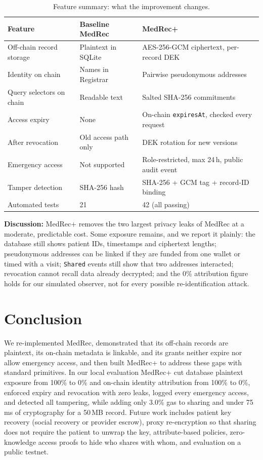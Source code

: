 \documentclass[11pt,a4paper]{article}
\begin{document}
\begin{table}[H]
\centering\small
\caption{Feature summary: what the improvement changes.}
\label{tab:features}
\begin{tabularx}{\linewidth}{@{}l Y Y@{}}
\toprule
\textbf{Feature} & \textbf{Baseline MedRec} & \textbf{MedRec+} \\
\midrule
Off-chain record storage & Plaintext in SQLite & AES-256-GCM ciphertext, per-record DEK \\
Identity on chain & Names in Registrar & Pairwise pseudonymous addresses \\
Query selectors on chain & Readable text & Salted SHA-256 commitments \\
Access expiry & None & On-chain \texttt{expiresAt}, checked every request \\
After revocation & Old access path only & DEK rotation for new versions \\
Emergency access & Not supported & Role-restricted, max 24\,h, public audit event \\
Tamper detection & SHA-256 hash & SHA-256 + GCM tag + record-ID binding \\
Automated tests & 21 & 42 (all passing) \\
\bottomrule
\end{tabularx}
\end{table}

\textbf{Discussion:} MedRec+ removes the two largest privacy leaks of MedRec at a
moderate, predictable cost. Some exposure remains, and we report it plainly: the
database still shows patient IDs, timestamps and ciphertext lengths; pseudonymous
addresses can be linked if they are funded from one wallet or timed with a visit;
\texttt{Shared} events still show that two addresses interacted; revocation cannot
recall data already decrypted; and the 0\% attribution figure holds for our
simulated observer, not for every possible re-identification attack.

\section{Conclusion}
We re-implemented MedRec, demonstrated that its off-chain records are plaintext,
its on-chain metadata is linkable, and its grants neither expire nor allow
emergency access, and then built MedRec+ to address these gaps with standard
primitives. In our local evaluation MedRec+ cut database plaintext exposure from
100\% to 0\% and on-chain identity attribution from 100\% to 0\%, enforced expiry
and revocation with zero leaks, logged every emergency access, and detected all
tampering, while adding only 3.0\% gas to sharing and under 75\,ms of cryptography
for a 50\,MB record. Future work includes patient key recovery (social recovery or
provider escrow), proxy re-encryption so that sharing does not require the patient
to unwrap the key, attribute-based policies, zero-knowledge access proofs to hide
who shares with whom, and evaluation on a public testnet.
\end{document}
